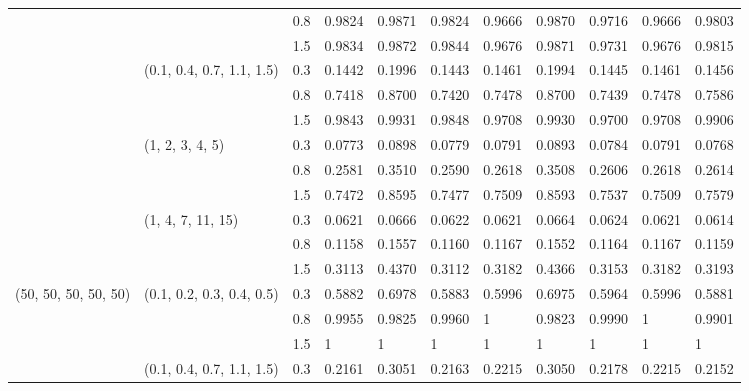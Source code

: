 \begin{table}[h]
\begin{tabular}{lllllllllll}
                     		&                           		& 0.8   	& 0.9824 	& 0.9871 	& 0.9824 	& 0.9666 	& 0.9870 	& 0.9716 	& 0.9666 	& 0.9803 \\
                     		&                           		& 1.5   	& 0.9834 	& 0.9872 	& 0.9844 	& 0.9676 	& 0.9871 	& 0.9731 	& 0.9676 	& 0.9815 \\
                     		& (0.1, 0.4, 0.7, 1.1, 1.5) 	& 0.3   	& 0.1442 	& 0.1996 	& 0.1443 	& 0.1461 	& 0.1994 	& 0.1445 	& 0.1461 	& 0.1456 \\
                     		&                           		& 0.8   	& 0.7418 	& 0.8700 	& 0.7420 	& 0.7478 	& 0.8700 	& 0.7439 	& 0.7478 	& 0.7586 \\
                     		&                           		& 1.5   	& 0.9843 	& 0.9931 	& 0.9848 	& 0.9708 	& 0.9930 	& 0.9700 	& 0.9708 	& 0.9906 \\
                     		& (1, 2, 3, 4, 5)           	& 0.3   	& 0.0773 	& 0.0898 	& 0.0779 	& 0.0791 	& 0.0893 	& 0.0784 	& 0.0791 	& 0.0768 \\
                     		&                           		& 0.8   	& 0.2581 	& 0.3510 	& 0.2590 	& 0.2618 	& 0.3508 	& 0.2606 	& 0.2618 	& 0.2614 \\
                     		&                           		& 1.5   	& 0.7472 	& 0.8595 	& 0.7477 	& 0.7509	& 0.8593 	& 0.7537 	& 0.7509 	& 0.7579 \\
                     		& (1, 4, 7, 11, 15)         	& 0.3   	& 0.0621 	& 0.0666 	& 0.0622 	& 0.0621 	& 0.0664 	& 0.0624 	& 0.0621 	& 0.0614 \\
                     		&                           		& 0.8   	& 0.1158 	& 0.1557 	& 0.1160 	& 0.1167 	& 0.1552 	& 0.1164 	& 0.1167 	& 0.1159 \\
                     		&                           		& 1.5   	& 0.3113 	& 0.4370 	& 0.3112 	& 0.3182 	& 0.4366 	& 0.3153 	& 0.3182 	& 0.3193 \\\midrule
(50, 50, 50, 50, 50) 	& (0.1, 0.2, 0.3, 0.4, 0.5) 	& 0.3   	& 0.5882 	& 0.6978 	& 0.5883 	& 0.5996 	& 0.6975 	& 0.5964 	& 0.5996 	& 0.5881 \\
                     		&                           		& 0.8   	& 0.9955 	& 0.9825 	& 0.9960 	& 1	 	& 0.9823 	& 0.9990 	& 1	 	& 0.9901 \\
                     		&                           		& 1.5   	& 1	 	& 1	 	& 1	 	& 1	 	& 1	 	& 1	 	& 1	 	& 1	       \\
                     		& (0.1, 0.4, 0.7, 1.1, 1.5) 	& 0.3   	& 0.2161 	& 0.3051 	& 0.2163 	& 0.2215 	& 0.3050 	& 0.2178 	& 0.2215 	& 0.2152 \\

\end{tabular}
\end{table}
